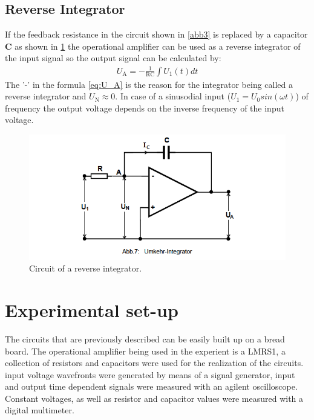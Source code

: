 \subsection{Reverse Integrator}
If the feedback resistance in the circuit shown in \ref{abb3} is replaced by a capacitor \textbf{C}
as shown in \ref{abb5} the operational amplifier can be used as a reverse integrator
of the input signal so the output signal can be calculated by:
\begin{align}
    U_{\text{A}} = -\frac{1}{\text{RC}} \int U_1(t) dt
    \label{eq:U_A}
\end{align}
The '-' in the formula \ref{eq:U_A} is the reason for the integrator being called a reverse
integrator and $U_{\text{N}} \approx 0$.
In case of a sinusodial input ($U_{1}=U_0 sin(\omega t)$) of frequency \omega the output voltage depends on the inverse frequency
of the input voltage.
\FloatBarrier
\begin{figure}
  \centering
  \includegraphics[scale=0.5]{integrator.PNG}
  \caption{Circuit of a reverse integrator. \cite{Q1}}
  \label{abb5}
\end{figure}
\FloatBarrier

\section{Experimental set-up}
The circuits that are previously described can be easily built up on a bread
board. The operational amplifier being used in the experient is a LMRS1, a
collection of resistors and capacitors were used for the realization of the
circuits.\\
input voltage wavefronts were generated by means of a signal generator, input
and output time dependent signals were measured with an agilent oscilloscope.
Constant voltages, as well as resistor and capacitor values were measured
with a digital multimeter.


